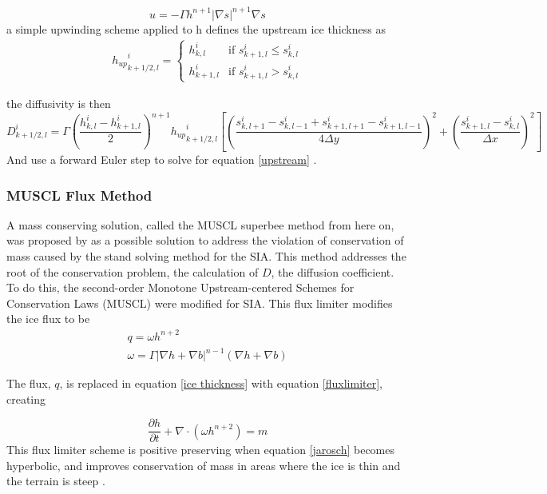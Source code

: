 \documentclass{article}
\begin{document}
\begin{equation}
    u = -\Gamma h^{n+1}|\nabla s|^{n+1}\nabla s
\end{equation}
a simple upwinding scheme applied to h defines the upstream ice thickness as 
\begin{align}
    {h_{up}}^i_{k+1/2,l}= 
	\begin{cases}
    h^i_{k,l}& \text{if } s^i_{k+1,l} \leq s^i_{k,l} \\
    h^i_{k+1,l}              & \text{if }  s^i_{k+1,l} > s^i_{k,l}
	\end{cases}
\end{align}

the diffusivity is then 
\begin{equation}
D^i_{k+1/2,l} = \Gamma \left( \frac{h^i_{k,l} - h^i_{k+1,l}}{2}\right)^{n+1} {h_{up}}^i_{k+1/2,l}\left[\left( \frac{s^i_{k,l+1}-s^i_{k,l-1}+ s^i_{k+1,l+1}-s^i_{k+1,l-1}}{4 \Delta y}\right)^2+ \left(\frac{s^i_{k+1,l}-s^i_{k,l}}{\Delta x}\right)^2\right]
\end{equation}
And use a forward Euler step to solve for equation \ref{upstream} \cite{Jarosch2013}. 


\subsubsection{MUSCL Flux Method}
A mass conserving solution, called the MUSCL superbee method from here on, was proposed by \citet{Jarosch2013} as a possible solution to address the violation of conservation of mass caused by the stand solving method for the SIA. This method addresses the root of the conservation problem, the calculation of $D$, the diffusion coefficient. To do this, the second-order Monotone Upstream-centered Schemes for Conservation Laws (MUSCL) were modified for SIA. This flux limiter modifies the ice flux to be 
\begin{subequations}\label{fluxlimiter}
\begin{gather}
q  = \omega h^{n+2}  \\
\omega  = \Gamma | \nabla h + \nabla b |^{n-1}(\nabla h + \nabla b) 
\end{gather}
\end{subequations}

The flux, $q$, is replaced in equation \ref{ice thickness} with equation \ref{fluxlimiter}, creating

\begin{equation}\label{jarosch}
\frac{\partial h}{\partial t} + \nabla \cdot (\omega h^{n+2}) = m 
\end{equation}
This flux limiter scheme is positive preserving when equation \ref{jarosch} becomes hyperbolic, and improves conservation of mass in areas where the ice is thin and the terrain is steep \citep{Jarosch2013}. 
\end{document}
